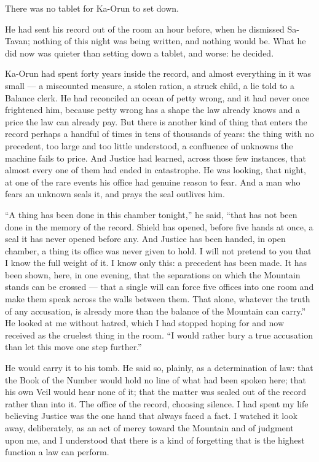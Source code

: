 \ornament
 
There was no tablet for Ka-Orun to set down.\par
 
He had sent his record out of the room an hour before, when he dismissed Sa-Tavan; nothing of this night was being written, and nothing would be. What he did now was quieter than setting down a tablet, and worse: he decided.\par
 
Ka-Orun had spent forty years inside the record, and almost everything in it was small --- a miscounted measure, a stolen ration, a struck child, a lie told to a Balance clerk. He had reconciled an ocean of petty wrong, and it had never once frightened him, because petty wrong has a shape the law already knows and a price the law can already pay. But there is another kind of thing that enters the record perhaps a handful of times in tens of thousands of years: the thing with no precedent, too large and too little understood, a confluence of unknowns the machine fails to price. And Justice had learned, across those few instances, that almost every one of them had ended in catastrophe. He was looking, that night, at one of the rare events his office had genuine reason to fear. And a man who fears an unknown seals it, and prays the seal outlives him.\par
 
``A thing has been done in this chamber tonight,'' he said, ``that has not been done in the memory of the record. Shield has opened, before five hands at once, a seal it has never opened before any. And Justice has been handed, in open chamber, a thing its office was never given to hold. I will not pretend to you that I know the full weight of it. I know only this: a precedent has been made. It has been shown, here, in one evening, that the separations on which the Mountain stands can be crossed --- that a single will can force five offices into one room and make them speak across the walls between them. That alone, whatever the truth of any accusation, is already more than the balance of the Mountain can carry.'' He looked at me without hatred, which I had stopped hoping for and now received as the cruelest thing in the room. ``I would rather bury a true accusation than let this move one step further.''\par
 
He would carry it to his tomb. He said so, plainly, as a determination of law: that the Book of the Number would hold no line of what had been spoken here; that his own Veil would hear none of it; that the matter was sealed out of the record rather than into it. The office of the record, choosing silence. I had spent my life believing Justice was the one hand that always faced a fact. I watched it look away, deliberately, as an act of mercy toward the Mountain and of judgment upon me, and I understood that there is a kind of forgetting that is the highest function a law can perform.\par
 
